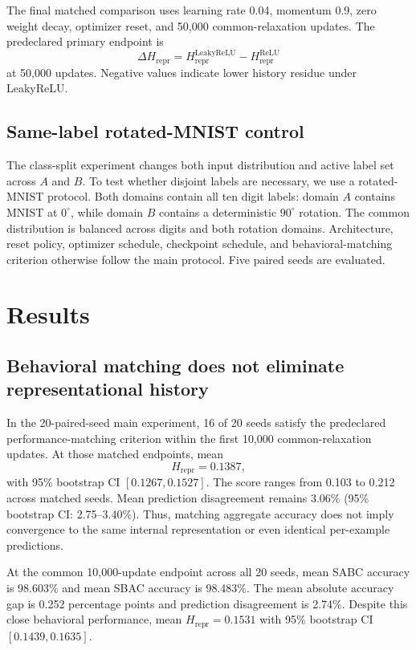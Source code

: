 \documentclass[11pt,a4paper]{article}
\newcommand{\hrepr}{H_{\mathrm{repr}}}
\begin{document}
The final matched comparison uses learning rate 0.04, momentum 0.9, zero weight decay, optimizer reset, and 50,000 common-relaxation updates. The predeclared primary endpoint is
\[
\Delta \hrepr=\hrepr^{\mathrm{LeakyReLU}}-\hrepr^{\mathrm{ReLU}}
\]
at 50,000 updates. Negative values indicate lower history residue under LeakyReLU.

\subsection{Same-label rotated-MNIST control}
The class-split experiment changes both input distribution and active label set across $A$ and $B$. To test whether disjoint labels are necessary, we use a rotated-MNIST protocol. Both domains contain all ten digit labels: domain $A$ contains MNIST at $0^\circ$, while domain $B$ contains a deterministic $90^\circ$ rotation. The common distribution is balanced across digits and both rotation domains. Architecture, reset policy, optimizer schedule, checkpoint schedule, and behavioral-matching criterion otherwise follow the main protocol. Five paired seeds are evaluated.

\section{Results}

\subsection{Behavioral matching does not eliminate representational history}
In the 20-paired-seed main experiment, 16 of 20 seeds satisfy the predeclared performance-matching criterion within the first 10,000 common-relaxation updates. At those matched endpoints, mean
\[
\hrepr=0.1387,
\]
with 95\% bootstrap CI $[0.1267,0.1527]$. The score ranges from 0.103 to 0.212 across matched seeds. Mean prediction disagreement remains 3.06\% (95\% bootstrap CI: 2.75--3.40\%). Thus, matching aggregate accuracy does not imply convergence to the same internal representation or even identical per-example predictions.

At the common 10,000-update endpoint across all 20 seeds, mean SABC accuracy is 98.603\% and mean SBAC accuracy is 98.483\%. The mean absolute accuracy gap is 0.252 percentage points and prediction disagreement is 2.74\%. Despite this close behavioral performance, mean $\hrepr=0.1531$ with 95\% bootstrap CI $[0.1439,0.1635]$.
\end{document}
